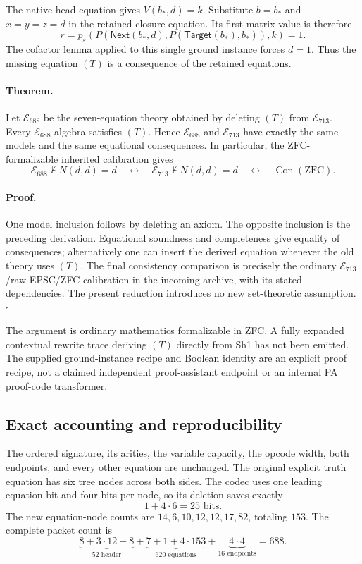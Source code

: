 The native head equation gives $V(b_*,d)=k$. Substitute $b=b_*$ and
$x=y=z=d$ in the retained closure equation. Its first matrix value is
therefore
\[
 r=p_\varepsilon\!\left(
  P(\mathsf{Next}(b_*,d),P(\mathsf{Target}(b_*),b_*)),k\right)=1.
\]
The cofactor lemma applied to this single ground instance forces $d=1$.
Thus the missing equation $(T)$ is a consequence of the retained
equations.

\paragraph{Theorem.}
Let $\mathcal E_{688}$ be the seven-equation theory obtained by deleting
$(T)$ from $\mathcal E_{713}$. Every $\mathcal E_{688}$ algebra satisfies
$(T)$. Hence $\mathcal E_{688}$ and $\mathcal E_{713}$ have exactly the
same models and the same equational consequences. In particular, the
ZFC-formalizable inherited calibration gives
\[
 \mathcal E_{688}\not\vdash N(d,d)=d
 \quad\longleftrightarrow\quad
 \mathcal E_{713}\not\vdash N(d,d)=d
 \quad\longleftrightarrow\quad
 \operatorname{Con}(\mathrm{ZFC}).
\]

\paragraph{Proof.}
One model inclusion follows by deleting an axiom. The opposite inclusion
is the preceding derivation. Equational soundness and completeness give
equality of consequences; alternatively one can insert the derived
equation whenever the old theory uses $(T)$. The final consistency
comparison is precisely the ordinary $\mathcal E_{713}$/raw-EPSC/ZFC
calibration in the incoming archive, with its stated dependencies.
The present reduction introduces no new set-theoretic assumption.
\hfill$\square$

The argument is ordinary mathematics formalizable in ZFC. A fully
expanded contextual rewrite trace deriving $(T)$ directly from Sh1 has
not been emitted. The supplied ground-instance recipe and Boolean
identity are an explicit proof recipe, not a claimed independent
proof-assistant endpoint or an internal PA proof-code transformer.

\subsection{Exact accounting and reproducibility}

The ordered signature, its arities, the variable capacity, the opcode
width, both endpoints, and every other equation are unchanged. The
original explicit truth equation has six tree nodes across both sides.
The codec uses one leading equation bit and four bits per node, so its
deletion saves exactly
\[
                        1+4\cdot6=25\text{ bits}.
\]
The new equation-node counts are
$14,6,10,12,12,17,82$, totaling $153$. The complete packet count is
\[
 \underbrace{8+3\cdot12+8}_{52\text{ header}}
 +\underbrace{7+1+4\cdot153}_{620\text{ equations}}
 +\underbrace{4\cdot4}_{16\text{ endpoints}}
 =688.
\]

